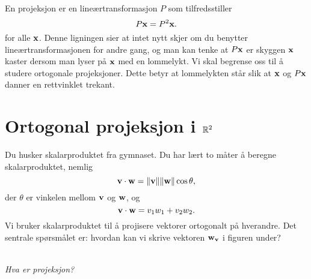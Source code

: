 

\label{ch:projeksjon}

En projeksjon er en lineærtransformasjon $P$ som tilfredsstiller
\[
 P\mathbf{x}=P^2\mathbf{x}.
 \]
 for alle $\mathbf{x}$. Denne ligningen sier at intet nytt skjer om du benytter lineærtransformasjonen for andre gang,
 og man kan tenke at $ P\mathbf{x}$ er skyggen $\mathbf{x}$ kaster dersom man lyser på $\mathbf{x}$ med en lommelykt.
Vi skal begrense oss til å studere ortogonale projeksjoner. 
Dette betyr at lommelykten står slik at $\mathbf{x}$ og $P\mathbf{x}$ danner en rettvinklet trekant.

 
 \section*{Ortogonal projeksjon i $\mathbb{R}^2$}
 Du husker skalarproduktet fra gymnaset.
  Du har lært to måter å beregne skalarproduktet, nemlig
\[
 \mathbf{v}\cdot  \mathbf{w} = \|\mathbf{v}\| \|\mathbf{w}\| \cos \theta,
 \] 
der $\theta$ er vinkelen mellom $\mathbf{v}$ og $\mathbf{w}$, og 
\[
 \mathbf{v}\cdot  \mathbf{w} = v_1 w_1+v_2w_2.
 \] 
Vi bruker skalarproduktet til å projisere vektorer ortogonalt på hverandre. Det sentrale spørsmålet er: hvordan kan vi skrive vektoren $\mathbf{w}_{\mathbf{v}}$ i figuren under? 
 \begin{center}
\\
{\small \textit{Hva er projeksjon?}}
\end{center}
